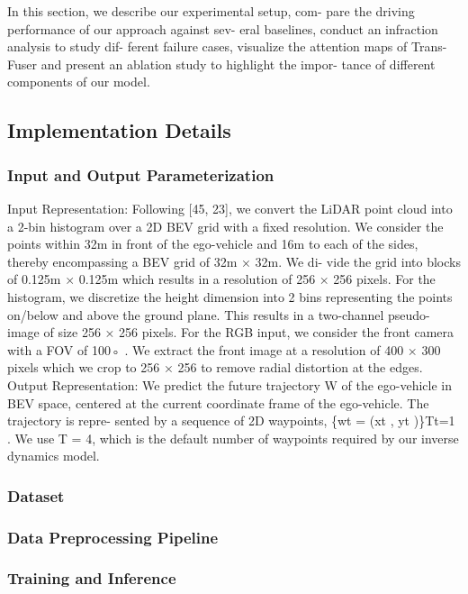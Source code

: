 \documentclass[letterpaper, 12pt]{article}
\theoremstyle{definition}
\theoremstyle{definition}
\theoremstyle{definition}
\theoremstyle{definition}
\theoremstyle{definition}
\begin{document}
In this section, we describe our experimental setup, com-
pare the driving performance of our approach against sev-
eral baselines, conduct an infraction analysis to study dif-
ferent failure cases, visualize the attention maps of Trans-
Fuser and present an ablation study to highlight the impor-
tance of different components of our model.

\subsection{Implementation Details}
\label{sec:orgf557e02}

\subsubsection{Input and Output Parameterization}
\label{sec:org813feb3}
Input Representation: Following [45, 23], we convert the
LiDAR point cloud into a 2-bin histogram over a 2D BEV
grid with a fixed resolution. We consider the points within
32m in front of the ego-vehicle and 16m to each of the sides,
thereby encompassing a BEV grid of 32m × 32m. We di-
vide the grid into blocks of 0.125m × 0.125m which results
in a resolution of 256 × 256 pixels. For the histogram, we
discretize the height dimension into 2 bins representing the
points on/below and above the ground plane. This results in
a two-channel pseudo-image of size 256 × 256 pixels. For
the RGB input, we consider the front camera with a FOV
of 100◦ . We extract the front image at a resolution of 400
× 300 pixels which we crop to 256 × 256 to remove radial
distortion at the edges.
Output Representation: We predict the future trajectory
W of the ego-vehicle in BEV space, centered at the current
coordinate frame of the ego-vehicle. The trajectory is repre-
sented by a sequence of 2D waypoints, \{wt = (xt , yt )\}Tt=1 .
We use T = 4, which is the default number of waypoints
required by our inverse dynamics model.

\subsubsection{Dataset}
\label{sec:org5fd5e5f}

\subsubsection{Data Preprocessing Pipeline \label{org0da3d78}}
\label{sec:org5adbe6e}


\subsubsection{Training and Inference}
\label{sec:orga87ef82}
\end{document}
